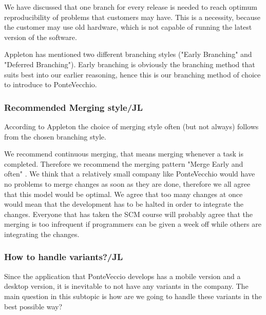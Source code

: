 \documentclass[10pt]{article}
\begin{document}
\noindent We have discussed that one branch for every release is needed to reach optimum reproducibility of problems that customers may have. This is a necessity, because the customer may use old hardware, which is not capable of running the latest version of the software.

\noindent Appleton \cite{Appleton} has mentioned two different branching styles ("Early Branching" and "Deferred Branching"). Early branching is obviously the branching method that suits best into our earlier reasoning, hence this is our branching method of choice to introduce to PonteVecchio. 

\subsubsection{Recommended Merging style/JL}
\noindent According to Appleton \cite{Appleton} the choice of merging style often (but not always) follows from the chosen branching style.

\noindent We recommend continuous merging, that means merging whenever a task is completed. Therefore we recommend the merging pattern "Merge Early and often" \cite{Appleton}. We think that a relatively small company like PonteVecchio would have no problems to merge changes as soon as they are done, therefore we all agree that this model would be optimal. We agree that too many changes at once would mean that the development has to be halted in order to integrate the changes. Everyone that has taken the SCM course will probably agree that the merging is too infrequent if programmers can be given a week off while others are integrating the changes.

\subsubsection{How to handle variants?/JL}
Since the application that PonteVeccio develops has a mobile version and a desktop version, it is inevitable to not have any variants in the company. The main question in this subtopic is how are we going to handle these variants in the best possible way?
\end{document}
